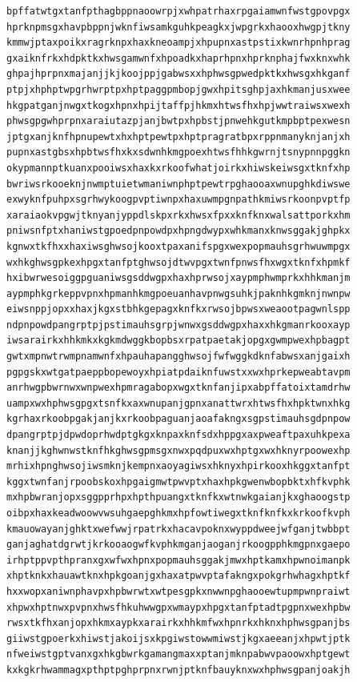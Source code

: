 \documentclass[11pt,letterpaper]{exam}
\begin{document}
\begin{questions}
\begin{verbatim}
bpffatwtgxtanfpthagbppnaoowrpjxwhpatrhaxrpgaiamwnfwstgpovpgx
hprknpmsgxhavpbppnjwknfiwsamkguhkpeagkxjwpgrkxhaooxhwgpjtkny
kmmwjptaxpoikxragrknpxhaxkneoampjxhpupnxastpstixkwnrhpnhprag
gxaiknfrkxhdpktkxhwsgamwnfxhpoadkxhaprhpnxhprknphajfwxknxwhk
ghpajhprpnxmajanjjkjkoojppjgabwsxxhphwsgpwedpktkxhwsgxhkganf
ptpjxhphptwpgrhwrptpxhptpaggpmbopjgwxhpitsghpjaxhkmanjusxwee
hkgpatganjnwgxtkogxhpnxhpijtaffpjhkmxhtwsfhxhpjwwtraiwsxwexh
phwsgpgwhprpnxaraiutazpjanjbwtpxhpbstjpnwehkgutkmpbptpexwesn
jptgxanjknfhpnupewtxhxhptpewtpxhptpragratbpxrppnmanyknjanjxh
pupnxastgbsxhpbtwsfhxkxsdwnhkmgpoexhtwsfhhkgwrnjtsnypnnpggkn
okypmannptkuanxpooiwsxhaxkxrkoofwhatjoirkxhiwskeiwsgxtknfxhp
bwriwsrkooeknjnwmptuietwmaniwnphptpewtrpghaooaxwnupghkdiwswe
exwyknfpuhpxsgrhwykoogpvptiwnpxhaxuwmpgnpathkmiwsrkoonpvptfp
xaraiaokvpgwjtknyanjyppdlskpxrkxhwsxfpxxknfknxwalsattporkxhm
pniwsnfptxhaniwstgpoedpnpowdpxhpngdwypxwhkmanxknwsggakjghpkx
kgnwxtkfhxxhaxiwsghwsojkooxtpaxanifspgxwexpopmauhsgrhwuwmpgx
wxhkghwsgpkexhpgxtanfptghwsojdtwvpgxtwnfpnwsfhxwgxtknfxhpmkf
hxibwrwesoiggpguaniwsgsddwgpxhaxhprwsojxaypmphwmprkxhhkmanjm
aypmphkgrkeppvpnxhpmanhkmgpoeuanhavpnwgsuhkjpaknhkgmknjnwnpw
eiwsnppjopxxhaxjkgxstbhkgepagxknfkxrwsojbpwsxweaootpagwnlspp
ndpnpowdpangrptpjpstimauhsgrpjwnwxgsddwgpxhaxxhkgmanrkooxayp
iwsarairkxhhkmkxkgkmdwggkbopbsxrpatpaetakjopgxgwmpwexhpbagpt
gwtxmpnwtrwmpnamwnfxhpauhapangghwsojfwfwggkdknfabwsxanjgaixh
pgpgskxwtgatpaeppbopewoyxhpiatpdaiknfuwstxxwxhprkepweabtavpm
anrhwgpbwrnwxwnpwexhpmragabopxwgxtknfanjipxabpffatoixtamdrhw
uampxwxhphwsgpgxtsnfkxaxwnupanjgpnxanattwrxhtwsfhxhpktwnxhkg
kgrhaxrkoobpgakjanjkxrkoobpaguanjaoafakngxsgpstimauhsgdpnpow
dpangrptpjdpwdoprhwdptgkgxknpaxknfsdxhppgxaxpweaftpaxuhkpexa
knanjjkghwnwstknfhkghwsgpmsgxnwxpqdpuxwxhptgxwxhknyrpoowexhp
mrhixhpnghwsojiwsmknjkempnxaoyagiwsxhknyxhpirkooxhkggxtanfpt
kggxtwnfanjrpoobskoxhpgaigmwtpwvptxhaxhpkgwenwbopbktxhfkvphk
mxhpbwranjopxsggpprhpxhpthpuangxtknfkxwtnwkgaianjkxghaoogstp
oibpxhaxkeadwoowvwsuhgaepghkmxhpfowtiwegxtknfknfkxkrkoofkvph
kmauowayanjghktxwefwwjrpatrkxhacavpoknxwyppdweejwfganjtwbbpt
ganjaghatdgrwtjkrkooaogwfkvphkmganjaoganjrkoogpphkmgpnxgaepo
irhptppvpthpranxgxwfwxhpnxpopmauhsggakjmwxhptkamxhpwnoimanpk
xhptknkxhauawtknxhpkgoanjgxhaxatpwvptafakngxpokgrhwhagxhptkf
hxxwopxaniwnphavpxhpbwrwtxwtpesgpkxnwwnpghaooewtupmpwnpraiwt
xhpwxhptnwxpvpnxhwsfhkuhwwgpxwmaypxhpgxtanfptadtpgpnxwexhpbw
rwsxtkfhxanjopxhkmxaypkxarairkxhhkmfwxhpnrkxhknxhphwsgpanjbs
giiwstgpoerkxhiwstjakoijsxkpgiwstowwmiwstjkgxaeeanjxhpwtjptk
nfweiwstgptvanxgxhkgbwrkgamangmaxxptanjmknpabwvpaoowxhptgewt
kxkgkrhwammagxpthptpghprpnxrwnjptknfbauyknxwxhphwsgpanjoakjh

\end{verbatim}
\end{questions}
\end{document}
